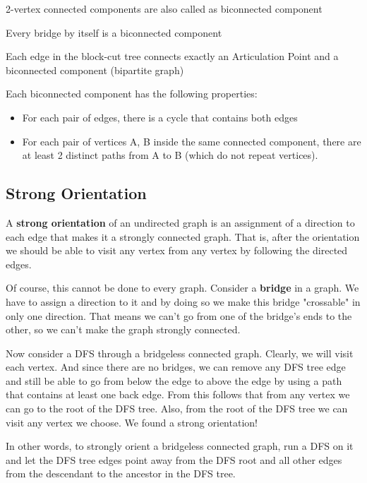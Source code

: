 	2-vertex connected components are also called as biconnected component
	
	Every bridge by itself is a biconnected component

	Each edge in the block-cut tree connects exactly an Articulation Point and a biconnected component (bipartite graph)

	Each biconnected component has the following properties:

	\begin{itemize}
		\item For each pair of edges, there is a cycle that contains both edges
		\item For each pair of vertices {A, B} inside the same connected component, there are at least 2 distinct paths from A to B (which do not repeat vertices).
	\end{itemize}

	
	\newpage

	\subsection{Strong Orientation}

	A \textbf{strong orientation} of an undirected graph is an assignment of a direction to each edge that makes it a strongly connected graph.
	That is, after the orientation we should be able to visit any vertex from any vertex by following the directed edges.

	Of course, this cannot be done to every graph. Consider a \textbf{bridge} in a graph.
	We have to assign a direction to it and by doing so we make this bridge "crossable" in only one direction.
	That means we can't go from one of the bridge's ends to the other, so we can't make the graph strongly connected.

	Now consider a DFS through a bridgeless connected graph. Clearly, we will visit each vertex.
	And since there are no bridges, we can remove any DFS tree edge and still be able to go from below the edge to
	above the edge by using a path that contains at least one back edge. 
	From this follows that from any vertex we can go to the root of the DFS tree. 
	Also, from the root of the DFS tree we can visit any vertex we choose. We found a strong orientation!

	In other words, to strongly orient a bridgeless connected graph, 
	run a DFS on it and let the DFS tree edges point away from the DFS root and all other edges 
	from the descendant to the ancestor in the DFS tree.

